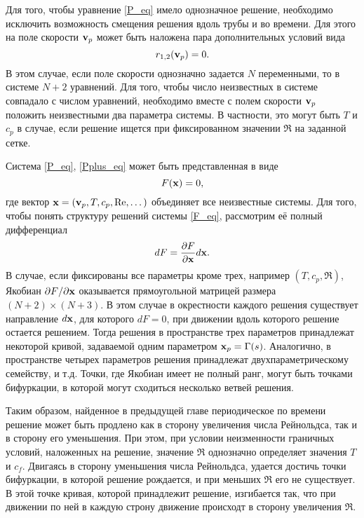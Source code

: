 Для того, чтобы уравнение \eqref{P_eq} имело однозначное решение, необходимо исключить возможность смещения решения вдоль трубы и во времени. Для этого на поле скорости $\mathbf{v}_p$ может быть наложена пара дополнительных условий вида 
\begin{equation}\label{Pplus_eq}
r_{1,2}(\mathbf{v}_p) = 0.
\end{equation}
В этом случае, если поле скорости однозначно задается $N$ переменными, то в системе $N+2$ уравнений. Для того, чтобы число неизвестных в системе совпадало с числом уравнений, необходимо вместе с полем скорости $\mathbf{v}_p$ положить неизвестными два параметра системы. В частности, это могут быть $T$ и $c_p$ в случае, если решение ищется при фиксированном значении $\Re$ на заданной сетке. 

Система \eqref{P_eq}, \eqref{Pplus_eq} может быть представленная в виде 
\begin{equation}\label{F_eq}
F(\mathbf{x}) = 0, 
\end{equation}
где вектор $\mathbf{x} = (\mathbf{v}_p, T, c_p, \operatorname{Re}, \dots)$ объединяет все неизвестные системы. Для того, чтобы понять структуру решений системы \eqref{F_eq}, рассмотрим её полный дифференциал
\begin{equation}\label{dF_eq}
dF = \frac{\partial F}{\partial \mathbf{x}}d\mathbf{x}.
\end{equation}
В случае, если фиксированы все параметры кроме трех, например $(T, c_p, \Re)$, Якобиан ${\partial F}/{\partial \mathbf{x}}$ оказывается прямоугольной матрицей размера $(N+2) \times (N+3)$. В этом случае в окрестности каждого решения существует направление $d\mathbf{x}$, для которого $dF = 0$, при движении вдоль которого решение остается решением. Тогда решения в пространстве трех параметров принадлежат некоторой кривой, задаваемой одним параметром $\mathbf{x}_p = \Gamma(s)$. Аналогично, в пространстве четырех параметров решения принадлежат двухпараметрическому семейству, и т.д. Точки, где Якобиан имеет не полный ранг, могут быть точками бифуркации, в которой могут сходиться несколько ветвей решения. 

Таким образом, найденное в предыдущей главе периодическое по времени решение может быть продлено как в сторону увеличения числа Рейнольдса, так и в сторону его уменьшения. При этом, при условии неизменности граничных условий, наложенных на решение, значение $\Re$ однозначно определяет значения $T$ и $c_f$. Двигаясь в сторону уменьшения числа Рейнольдса, удается достичь точки бифуркации, в которой решение рождается, и при меньших $\Re$ его не существует. В этой точке кривая, которой принадлежит решение, изгибается так, что при движении по ней в каждую строну движение происходт в сторону увеличения $\Re$. 


